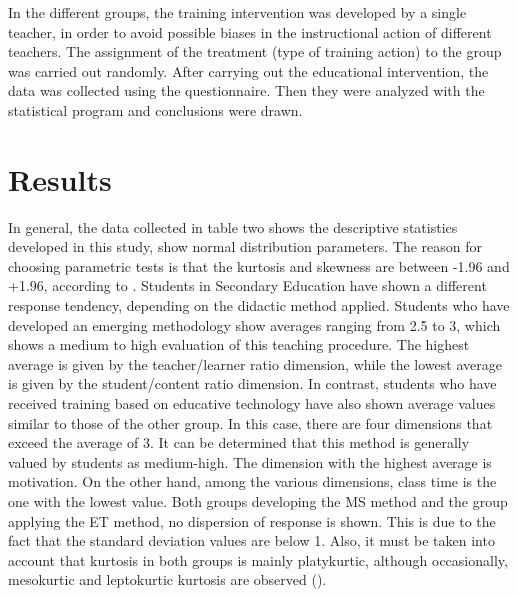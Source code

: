 \documentclass{textolivre}
\begin{document}
In the different groups, the training intervention was developed by a single teacher, in order to avoid possible biases in the instructional action of different teachers. The assignment of the treatment (type of training action) to the group was carried out randomly. After carrying out the educational intervention, the data was collected using the questionnaire. Then they were analyzed with the statistical program and conclusions were drawn.

\section{Results}
In general, the data collected in table two shows the descriptive statistics developed in this study, show normal distribution parameters. The reason for choosing parametric tests is that the kurtosis and skewness are between -1.96 and +1.96, according to \textcite{joreskog2001}. Students in Secondary Education have shown a different response tendency, depending on the didactic method applied. Students who have developed an emerging methodology show averages ranging from 2.5 to 3, which shows a medium to high evaluation of this teaching procedure. The highest average is given by the teacher/learner ratio dimension, while the lowest average is given by the student/content ratio dimension. In contrast, students who have received training based on educative technology have also shown average values similar to those of the other group. In this case, there are four dimensions that exceed the average of 3. It can be determined that this method is generally valued by students as medium-high. The dimension with the highest average is motivation. On the other hand, among the various dimensions, class time is the one with the lowest value. Both groups developing the MS method and the group applying the ET method, no dispersion of response is shown. This is due to the fact that the standard deviation values are below 1. Also, it must be taken into account that kurtosis in both groups is mainly platykurtic, although occasionally, mesokurtic and leptokurtic kurtosis are observed ().
\end{document}
